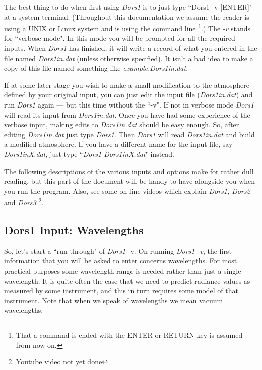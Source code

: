 \documentclass[12pt]{article}
\begin{document}
The best thing to do when first using {\it Dors1} is to just type ``Dors1 -v [ENTER]" at a system terminal.
(Throughout this documentation we assume the reader is using a UNIX or Linux
system and is using the command line \footnote[2]{That a command is ended with the
  ENTER or RETURN key is assumed from now on.}.)
The { \it -v} stands for ``verbose mode". In this mode you will be prompted for all the required
inputs. When {\it Dors1} has finished, it will write a record of what you entered 
 in the file named  {\it Dors1in.dat} (unless otherwise specified).  It isn't a bad idea to make a copy of this file  named something 
like {\it example.Dors1in.dat}.

If at some later stage you wish to make a small modification to the atmosphere defined by your original input, you can 
just edit the input file ({\it Dors1in.dat}) and run {\it Dors1} again --- but this time without the ``-v". If not in verbose
mode {\it Dors1} will read its input from {\it Dors1in.dat}. 
Once you have had some experience of the verbose input, making edits 
to {\it Dors1in.dat} should be easy enough.
So, after editing {\it Dors1in.dat} just type {\it Dors1}. Then {\it Dors1} will read {\it Dors1in.dat} and build a modified
atmosphere. If you have a different name for the input file, say {\it Dors1inX.dat}, just type
``{\it Dors1 Dors1inX.dat}" instead. 


The following descriptions of the various inputs and options make for rather dull reading, but this part of
the document will be handy to have alongside
you when you run the program. Also, see some on-line videos which explain 
 {\it Dors1, Dors2} and {\it Dors3} \footnote[1]{Youtube video not yet done}.

\subsection{Dors1 Input: Wavelengths}

So, let's start a ``run through" of {\it Dors1} -v.
On running {\it Dors1 -v}, the first information that you will be asked to enter concerns wavelengths.
For most practical purposes some wavelength range is needed rather than just a single wavelength. It
is quite often the case that we need to predict radiance values as measured by 
 some  instrument, and this  in turn requires some
model of that instrument. Note that when we speak of  wavelengths we mean  vacuum wavelengths.
\end{document}
